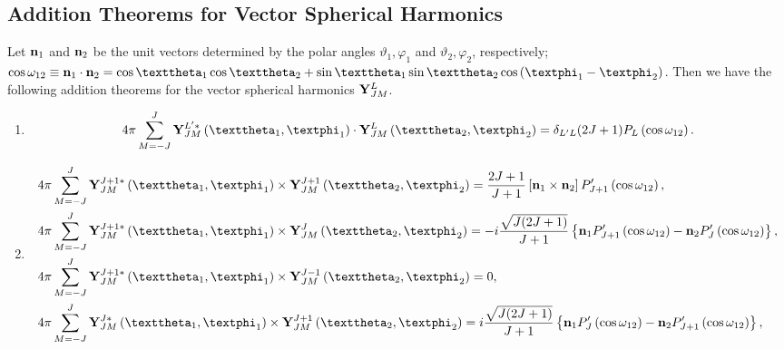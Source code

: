 \subsection{Addition Theorems for Vector Spherical Harmonics}\label{sec:7.3.11}
Let $\mathbf{n}_{1}$ and $\mathbf{n}_{2}$ be the unit vectors determined by the polar angles $\vartheta_{1}, \varphi_{1}$ and $\vartheta_{2}, \varphi_{2}$, respectively; $\cos \omega_{12} \equiv \vect{n}_{1} \cdot \vect{n}_{2}=\cos \vartheta_{1} \cos \vartheta_{2}+\sin \vartheta_{1} \sin \vartheta_{2} \cos \left(\varphi_{1}-\varphi_{2}\right)$. Then we have the following addition theorems for the vector spherical harmonics $\mathbf{Y}_{J M}^{L}$.\\
\begin{enumerate}[label=(\alph*)]
\item
\begin{equation}
4 \pi \sum_{M=-J}^{J} \vect{Y}_{J M}^{L^{\prime} *}\left(\vartheta_{1}, \varphi_{1}\right) \cdot \vect{Y}_{J M}^{L}\left(\vartheta_{2}, \varphi_{2}\right)=\delta_{L^{\prime} L}(2 J+1) P_{L}\left(\cos \omega_{12}\right). \label{eq:7:3:102}
\end{equation}
\item
\begin{align}
& 4 \pi \sum_{M=-J}^{J} \vect{Y}_{J M}^{J+1 *}\left(\vartheta_{1}, \varphi_{1}\right) \times \vect{Y}_{J M}^{J+1}\left(\vartheta_{2}, \varphi_{2}\right)=\frac{2 J+1}{J+1}\left[\vect{n}_{1} \times \vect{n}_{2}\right] P_{J+1}^{\prime}\left(\cos \omega_{12}\right), \notag\\
& 4 \pi \sum_{M=-J}^{J} \vect{Y}_{J M}^{J+1 *}\left(\vartheta_{1}, \varphi_{1}\right) \times \vect{Y}_{J M}^{J}\left(\vartheta_{2}, \varphi_{2}\right)=-i \frac{\sqrt{J(2 J+1)}}{J+1}\left\{\vect{n}_{1} P_{J+1}^{\prime}\left(\cos \omega_{12}\right)-\vect{n}_{2} P_{J}^{\prime}\left(\cos \omega_{12}\right)\right\}, \label{eq:7:3:103}\\
& 4 \pi \sum_{M=-J}^{J} \vect{Y}_{J M}^{J+1 *}\left(\vartheta_{1}, \varphi_{1}\right) \times \vect{Y}_{J M}^{J-1}\left(\vartheta_{2}, \varphi_{2}\right)=0, \notag\\
& 4 \pi \sum_{M=-J}^{J} \vect{Y}_{J M}^{J *}\left(\vartheta_{1}, \varphi_{1}\right) \times \vect{Y}_{J M}^{J+1}\left(\vartheta_{2}, \varphi_{2}\right)=i \frac{\sqrt{J(2 J+1)}}{J+1}\left\{\vect{n}_{1} P_{J}^{\prime}\left(\cos \omega_{12}\right)-\vect{n}_{2} P_{J+1}^{\prime}\left(\cos \omega_{12}\right)\right\}, \notag

\end{align}
\end{enumerate}
